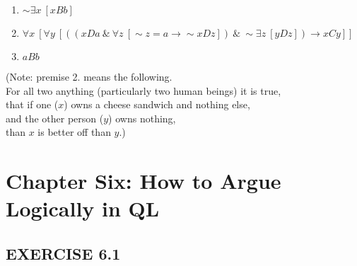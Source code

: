 \documentclass[a4paper,12pt]{article}
\newcommand{\ra}{\rightarrow}
\newcommand{\s}{\sim}
\newcommand{\ta}{ \ \& \ }
\newcommand{\all}{\forall}
\newcommand{\ex}{\exists}
\begin{document}
\begin{enumerate}[label=\arabic*,leftmargin=*]
            \begin{enumerate}[label=\arabic*.]
                \item $\s \ex x \ [xBb]$
                \item $\all x \ [\all y \ [((xDa \ta \all z \ [\s z=a \ra \s xDz]) \ta \s \ex z \ [yDz]) \ra xCy]]$
                \item $aBb$
            \end{enumerate}
            (Note: premise 2. means the following.\\
            For all two anything (particularly two human beings) it is true,\\
            that if one ($x$) owns a cheese sandwich and nothing else,\\
            and the other person ($y$) owns nothing,\\
            than $x$ is better off than $y$.)
    \end{enumerate}

    \section*{Chapter Six: How to Argue Logically in QL}

    \subsection*{EXERCISE 6.1}
\end{document}
